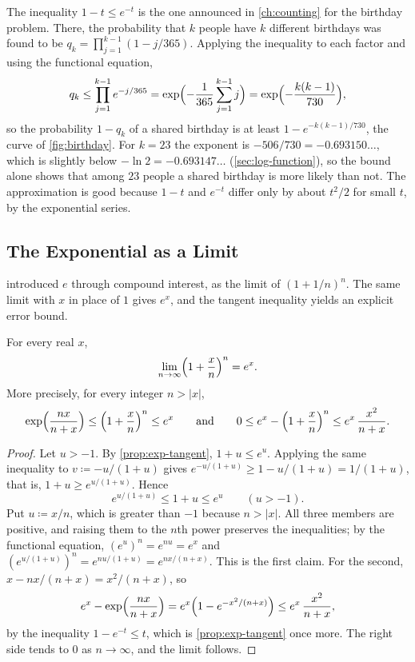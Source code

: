 The inequality $1-t\le e^{-t}$ is the one announced in \cref{ch:counting} for the birthday problem. There, the probability that $k$ people have $k$ different birthdays was found to be $q_k=\prod_{j=1}^{k-1}(1-j/365)$. Applying the inequality to each factor and using the functional equation,
\[
q_k\le\prod_{j=1}^{k-1}e^{-j/365}=\exp\Bigl(-\frac1{365}\sum_{j=1}^{k-1}j\Bigr)=\exp\Bigl(-\frac{k(k-1)}{730}\Bigr),
\]
so the probability $1-q_k$ of a shared birthday is at least $1-e^{-k(k-1)/730}$, the curve of \cref{fig:birthday}. For $k=23$ the exponent is $-506/730=-0.693150\ldots$, which is slightly below $-\ln2=-0.693147\ldots$ (\cref{sec:log-function}), so the bound alone shows that among $23$ people a shared birthday is more likely than not. The approximation is good because $1-t$ and $e^{-t}$ differ only by about $t^2/2$ for small $t$, by the exponential series.

\subsection{The Exponential as a Limit}

 introduced $e$ through compound interest, as the limit of $(1+1/n)^n$. The same limit with $x$ in place of $1$ gives $e^x$, and the tangent inequality yields an explicit error bound.

\begin{theorem}
\label{thm:exp-limit}
For every real $x$,
\[
\lim_{n\to\infty}\Bigl(1+\frac xn\Bigr)^n=e^x .
\]
More precisely, for every integer $n>|x|$,
\[
\exp\Bigl(\frac{nx}{n+x}\Bigr)\le\Bigl(1+\frac xn\Bigr)^n\le e^x
\qquad\text{and}\qquad
0\le e^x-\Bigl(1+\frac xn\Bigr)^n\le e^x\,\frac{x^2}{n+x} .
\]
\end{theorem}

\begin{proof}
Let $u>-1$. By \cref{prop:exp-tangent}, $1+u\le e^u$. Applying the same inequality to $v\coloneqq-u/(1+u)$ gives $e^{-u/(1+u)}\ge1-u/(1+u)=1/(1+u)$, that is, $1+u\ge e^{u/(1+u)}$. Hence
\[
e^{u/(1+u)}\le1+u\le e^u\qquad(u>-1).
\]
Put $u\coloneqq x/n$, which is greater than $-1$ because $n>|x|$. All three members are positive, and raising them to the $n$th power preserves the inequalities; by the functional equation, $(e^u)^n=e^{nu}=e^x$ and $(e^{u/(1+u)})^n=e^{nu/(1+u)}=e^{nx/(n+x)}$. This is the first claim. For the second, $x-nx/(n+x)=x^2/(n+x)$, so
\[
e^x-\exp\Bigl(\frac{nx}{n+x}\Bigr)=e^x\Bigl(1-e^{-x^2/(n+x)}\Bigr)\le e^x\,\frac{x^2}{n+x},
\]
by the inequality $1-e^{-t}\le t$, which is \cref{prop:exp-tangent} once more. The right side tends to $0$ as $n\to\infty$, and the limit follows.
\end{proof}

